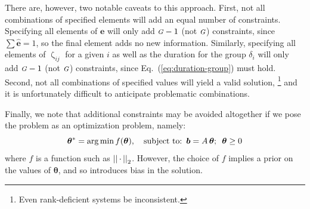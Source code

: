 \documentclass[10pt]{article}
\numberwithin{equation}{section}
\renewcommand{\zeta}{\upzeta}
\newcommand{\G}{{\mbox{\footnotesize{\textit{G}}}}}
\newcommand{\eq}[1]{Eq.~(\ref{#1})}
\begin{document}
\par
There are, however, two notable caveats to this approach.
First, not all combinations of specified elements will add an equal number of constraints.
Specifying all elements of $\bm{e}$
will only add $\G-1$ (not $\G$) constraints,
since $\sum \bm{\hat{e}} = 1$, so the final element adds no new information.
Similarly, specifying all elements of $\zeta_{ij}$ for a given $i$
as well as the duration for the group $\delta_i$
will only add $\G-1$ (not $\G$) constraints,
since \eq{eq:duration-group} must hold.
Second, not all combinations of specified values will yield a valid solution,%
\footnote{Even rank-deficient systems be inconsistent.}
and it is unfortunately difficult to anticipate problematic combinations.
\par
Finally, we note that additional constraints may be avoided altogether if we pose the problem
as an optimization problem, namely:
\begin{equation}\label{eq:system-optimize}
\bm{\theta}^{*} = {\arg \min}
  \thinspace f(\bm{\theta}),
  \quad \textrm{subject to:}
  \enspace\bm{b} = A\thinspace\bm{\theta};
  \enspace\bm{\theta} \ge 0
\end{equation}
where $f$ is a function such as ${\left|\left| \thinspace\cdot\thinspace \right|\right|}_2$.
However, the choice of $f$ implies a prior on the values of $\bm{\theta}$,
and so introduces bias in the solution.
\end{document}
